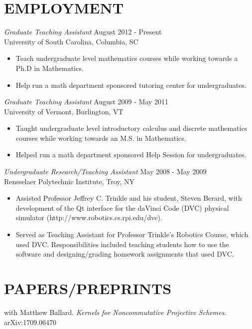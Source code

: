 \documentclass[line,overlapped]{res}
\begin{document}
\begin{resume}
  \section{EMPLOYMENT}
  \textsl{Graduate Teaching Assistant} \hfill August 2012 - Present \\
  University of South Carolina, Columbia, SC
  \begin{itemize}  \itemsep -2pt %
  \item
    Teach undergraduate level mathematics courses while working towards a Ph.D in Mathematics.
  \item 
    Help run a math department sponsored tutoring center for undergraduates.
  \end{itemize}
  
  \textsl{Graduate Teaching Assistant} \hfill August 2009 - May 2011 \\
  University of Vermont, Burlington, VT
  \begin{itemize}  \itemsep -2pt %
  \item
    Taught undergraduate level introductory calculus and discrete mathematics courses while working towards an M.S. in Mathematics.
  \item 
    Helped run a math department sponsored Help Session for undergraduates.
  \end{itemize}

  \textsl{Undergraduate Research/Teaching Assistant} \hfill May 2008 - May 2009 \\
  Rensselaer Polytechnic Institute, Troy, NY
  \begin{itemize}  \itemsep -2pt %
  \item Assisted Professor Jeffrey C. Trinkle and his student, Steven Berard, with development of the Qt interface for the daVinci Code (DVC) physical simulator (http://www.robotics.cs.rpi.edu/dvc).
  \item Served as Teaching Assistant for Professor Trinkle's Robotics Course, which used DVC.
    Responsibilities included teaching students how to use the software and designing/grading homework assignments that used DVC.
  \end{itemize}

  \newpage
  \section{PAPERS/PREPRINTS}
  with Matthew Ballard.  \textsl{Kernels for Noncommutative Projective Schemes.} 
  arXiv:1709.06470


\end{resume}
\end{document}
